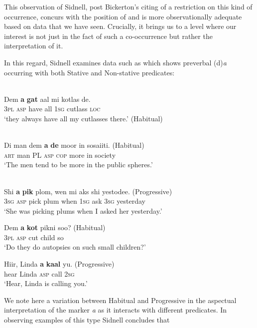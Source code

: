 This observation of Sidnell, post Bickerton’s citing of a restriction
on this kind of occurrence, concurs with the position of
\citet{Jaganauth1987} and is more observationally adequate based on
data that we have seen. Crucially, it brings us to a level where our
interest is not just in the fact of such a co-occurrence but rather
the interpretation of it.

In this regard, Sidnell examines data such as   which shows
preverbal (d)\textit{a} occurring with both Stative and Non-stative
predicates:

\ea%
\label{ex:2:20}
\citet[165]{Sidnell2002}\\
\ea
\gll Dem             \textbf{a} \textbf{gat}   aal     mi                    kotlas                   de.\\
		\textsc{3pl} \textsc{asp} have all     \textsc{1sg} cutlass \textsc{loc} \\
\glt `they always have all my cutlasses there.' (Habitual)

\ex \citet[154]{Sidnell2002}\\
\gll         Di man   dem               \textbf{a}                    \textbf{de}    moor  in   sosaiiti. (Habitual)\\
\textsc{art} man PL    \textsc{asp} \textsc{cop} more in society\\
\glt `The men tend to be more in the public spheres.' \z \z


\ea%
\label{ex:2:21}
\citet[154]{Sidnell2002}\\

\ea
\gll Shi \textbf{a} \textbf{pik} plom,      wen mi      aks  shi yestodee. (Progressive)\\
		\textsc{3sg} \textsc{asp} pick plum when \textsc{1sg} ask  \textsc{3sg} yesterday\\
\glt `She was picking plums when I asked her yesterday.'

\ex
\gll Dem \textbf{a} \textbf{kot} pikni soo? (Habitual)\\
		\textsc{3pl} \textsc{asp} cut child so\\
\glt `Do they do autopsies on such small children?'

\ex
\gll Hiir, Linda \textbf{a} \textbf{kaal} yu. (Progressive)\\
		hear Linda \textsc{asp} call \textsc{2sg}\\
\glt `Hear, Linda is calling you.' \z \z

We note here a variation between Habitual and Progressive in the
aspectual interpretation of the marker \textit{a} as it interacts with
different predicates.  In observing examples of this type Sidnell
concludes that

